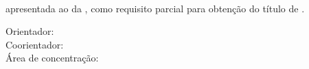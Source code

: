 \setcounter{page}{1}

\thispagestyle{empty}
\begin{center}
  \por{}%
\end{center}
\vfill %
\begin{center}
  \textbf{\monog{}}\\ %
  \textbf{\subtitulo{}} %
\end{center}
\vfill %
\begin{flushright}
  \begin{minipage}{9cm} %
    {\tipo{} apresentada ao \curso{} da \univ{}, como requisito parcial para obtenção do título de \grau{}.} \par{} %
    \vspace{1cm}
    Orientador: {\profOrientador{}} \\ %
    Coorientador: {\profA{}} \\
    \bigskip
    Área de concentração: {\areaConcentracao{}}
  \end{minipage}
\end{flushright}
\vfill %
\begin{center}
  \cidade\\ %
  \ano %
\end{center}
